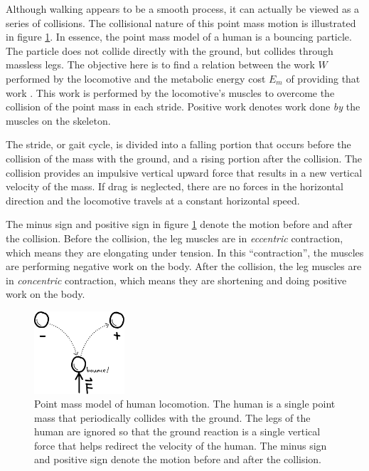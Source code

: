 Although walking appears to be a smooth process, it can actually be viewed as a series of collisions. The collisional nature of this point mass motion is illustrated in figure \ref{fig:Bounce}. In essence, the point mass model of a human is a bouncing particle. The particle does not collide directly with the ground, but collides through massless legs. The objective here is to find a relation between the work $W$ performed by the locomotive and the metabolic energy cost $E_{m}$ of providing that work \cite{ruina05}. This work is performed by the locomotive's muscles to overcome the collision of the point mass in each stride. Positive work denotes work done \emph{by} the muscles on the skeleton.

The stride, or gait cycle, is divided into a falling portion that occurs before the collision of the mass with the ground, and a rising portion after the collision. The collision provides an impulsive vertical upward force that results in a new vertical velocity of the mass. If drag is neglected, there are no forces in the horizontal direction and the locomotive travels at a constant horizontal speed.

The minus sign and positive sign in figure \ref{fig:Bounce} denote the motion before and after the collision. Before the collision, the leg muscles are in \emph{eccentric} contraction, which means they are elongating under tension. In this ``contraction'', the muscles are performing negative work on the body. After the collision, the leg muscles are in \emph{concentric} contraction, which means they are shortening and doing positive work on the body.

\begin{figure}[h]		%
\begin{centering}
\includegraphics[width=0.3\textwidth]{Figures/Bounce}\par
\end{centering}
\caption[Diagram: Point Mass Model of Human Locomotion]{Point mass model of human locomotion. The human is a single point mass that periodically collides with the ground. The legs of the human are ignored so that the ground reaction is a single vertical force that helps redirect the velocity of the human. The minus sign and positive sign denote the motion before and after the collision.}
\label{fig:Bounce}
\end{figure}
%

